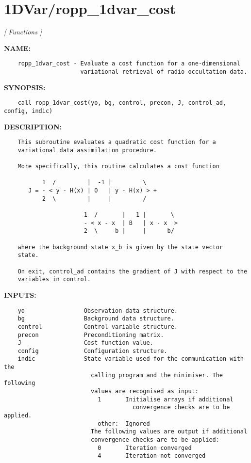 \section{1DVar/ropp\_1dvar\_cost}
\textsl{[ Functions ]}

\label{ch:robo0}
\label{ch:1DVar_ropp_1dvar_cost}
\textbf{NAME:}\hspace{0.08in}\begin{Verbatim}
    ropp_1dvar_cost - Evaluate a cost function for a one-dimensional 
                      variational retrieval of radio occultation data.
\end{Verbatim}
\textbf{SYNOPSIS:}\hspace{0.08in}\begin{Verbatim}
    call ropp_1dvar_cost(yo, bg, control, precon, J, control_ad, config, indic)
\end{Verbatim}
\textbf{DESCRIPTION:}\hspace{0.08in}\begin{Verbatim}
    This subroutine evaluates a quadratic cost function for a
    variational data assimilation procedure. 

    More specifically, this routine calculates a cost function

           1  /         |  -1 |         \
       J = - < y - H(x) | O   | y - H(x) > + 
           2  \         |     |         /

                       1  /       |  -1 |       \
                       - < x - x  | B   | x - x  >
                       2  \     b |     |      b/

    where the background state x_b is given by the state vector
    state.

    On exit, control_ad contains the gradient of J with respect to the 
    variables in control.
\end{Verbatim}
\textbf{INPUTS:}\hspace{0.08in}\begin{Verbatim}
    yo                 Observation data structure.
    bg                 Background data structure.
    control            Control variable structure.
    precon             Preconditioning matrix.
    J                  Cost function value.
    config             Configuration structure.
    indic              State variable used for the communication with the
                         calling program and the minimiser. The following
                         values are recognised as input:
                           1       Initialise arrays if additional 
                                     convergence checks are to be applied.
                           other:  Ignored
                         The following values are output if additional
                         convergence checks are to be applied:
                           0       Iteration converged
                           4       Iteration not converged
\end{Verbatim}
